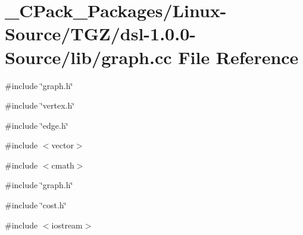 \section{\_\-CPack\_\-Packages/Linux-\/Source/TGZ/dsl-\/1.0.0-\/Source/lib/graph.cc File Reference}
\label{__CPack__Packages_2Linux-Source_2TGZ_2dsl-1_80_80-Source_2lib_2graph_8cc}
{\ttfamily \#include \char`\"{}graph.h\char`\"{}}\par
{\ttfamily \#include \char`\"{}vertex.h\char`\"{}}\par
{\ttfamily \#include \char`\"{}edge.h\char`\"{}}\par
{\ttfamily \#include $<$vector$>$}\par
{\ttfamily \#include $<$cmath$>$}\par
{\ttfamily \#include \char`\"{}graph.h\char`\"{}}\par
{\ttfamily \#include \char`\"{}cost.h\char`\"{}}\par
{\ttfamily \#include $<$iostream$>$}\par
